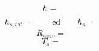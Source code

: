 \documentclass[a4paper,10pt]{article}                                                                                       %
\begin{document}
\begin{equation}                                                                                                            %
  h = \frac{}{}                                                                                   %
  \label{eqn:h}                                                                                                             %
\end{equation}                                                                                                              %
\begin{equation}                                                                                                            %
  h_{s,tot} = \frac{}{}                                                                           %
  \qquad\text{ed}\qquad                                                                                                     %
  \bar{h}_{s} = \frac{}{}                                                                         %
  \label{eqn:h_s}                                                                                                           %
\end{equation}                                                                                                              %
\begin{equation}                                                                                                            %
  R_{conv} =                                                                                      %
  \label{eqn:conv_r}                                                                                                        %
\end{equation}                                                                                                              %
\begin{equation}                                                                                                            %
  T_s =                                                                                           %
  \label{eqn:surf_temp}                                                                                                     %
\end{equation}                                                                                                              %
\end{document}
